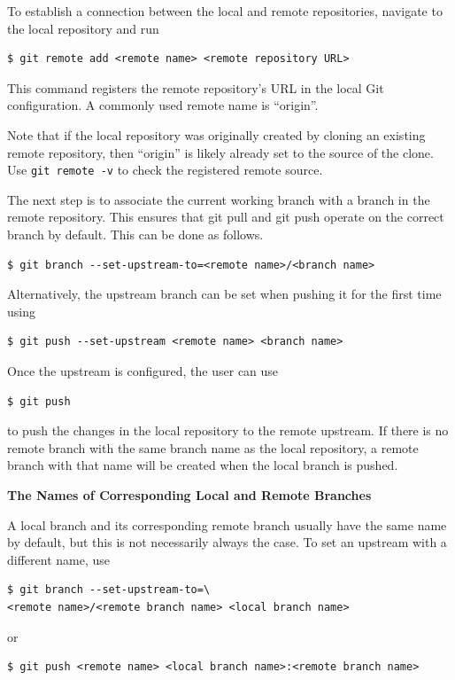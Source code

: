 To establish a connection between the local and remote repositories, navigate to the local repository and run
\begin{lstlisting}
$ git remote add <remote name> <remote repository URL>
\end{lstlisting}
This command registers the remote repository's URL in the local Git configuration. A commonly used remote name is ``origin''.

Note that if the local repository was originally created by cloning an existing remote repository, then ``origin'' is likely already set to the source of the clone. Use \verb|git remote -v| to check the registered remote source.

The next step is to associate the current working branch with a branch in the remote repository. This ensures that git pull and git push operate on the correct branch by default. This can be done as follows.
\begin{lstlisting}
$ git branch --set-upstream-to=<remote name>/<branch name>
\end{lstlisting}
Alternatively, the upstream branch can be set when pushing it for the first time using
\begin{lstlisting}
$ git push --set-upstream <remote name> <branch name>
\end{lstlisting}

Once the upstream is configured, the user can use 
\begin{lstlisting}
$ git push
\end{lstlisting}
to push the changes in the local repository to the remote upstream. If there is no remote branch with the same branch name as the local repository, a remote branch with that name will be created when the local branch is pushed.

\begin{mdframed}
\noindent \textbf{The Names of Corresponding Local and Remote Branches}

A local branch and its corresponding remote branch usually have the same name by default, but this is not necessarily always the case. To set an upstream with a different name, use
\begin{lstlisting}
$ git branch --set-upstream-to=\
<remote name>/<remote branch name> <local branch name>
\end{lstlisting}
or
\begin{lstlisting}
$ git push <remote name> <local branch name>:<remote branch name>
\end{lstlisting}

\end{mdframed}

